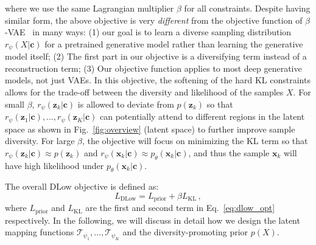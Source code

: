 \documentclass[runningheads]{llncs}
\begin{document}
	where we use the same Lagrangian multiplier $\beta$ for all constraints. Despite having similar form, the above objective is very \emph{different} from the objective function of $\beta$-VAE~\cite{higgins2017beta} in many ways: (1) our goal is to learn a diverse sampling distribution $r_\psi(X|\mathbf{c})$ for a pretrained generative model rather than learning the generative model itself; (2) The first part in our objective is a diversifying term instead of a reconstruction term; (3) Our objective function applies to most deep generative models, not just VAEs. In this objective, the softening of the hard KL constraints allows for the trade-off between the diversity and likelihood of the samples $X$. For small $\beta$, $r_\psi(\mathbf{z}_k|\mathbf{c})$ is allowed to deviate from $p(\mathbf{z}_k)$ so that $r_\psi(\mathbf{z}_1|\mathbf{c}), \ldots, r_\psi(\mathbf{z}_K|\mathbf{c})$ can potentially attend to different regions in the latent space as shown in Fig.~\ref{fig:overview} (latent space) to further improve sample diversity. For large $\beta$, the objective will focus on minimizing the KL term so that $r_\psi(\mathbf{z}_k|\mathbf{c})\approx p(\mathbf{z}_k)$ and $r_\psi(\mathbf{x}_k|\mathbf{c})\approx p_\theta(\mathbf{x}_k|\mathbf{c})$, and thus the sample $\mathbf{x}_k$ will have high likelihood under $p_\theta(\mathbf{x}_k|\mathbf{c})$. 
	
	
	The overall DLow objective is defined as:
	\begin{equation}
	\label{eq:dlow_overall}
	L_\text{DLow} = L_{\text{prior}}  + \beta L_{\text{KL}}\,,
	\end{equation}
	where $L_{\text{prior}}$ and $L_{\text{KL}}$ are the first and second term in Eq.~\eqref{eq:dlow_opt} respectively.
	In the following, we will discuss in detail how we design the latent mapping functions $\mathcal{T}_{\psi_1}, \ldots, \mathcal{T}_{\psi_K}$ and the diversity-promoting prior $p(X)$.
	
	
	
\end{document}

